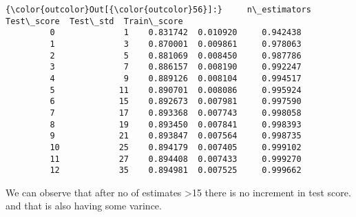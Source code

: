 \documentclass[11pt]{article}
\begin{document}
\begin{Verbatim}[commandchars=\\\{\}]
{\color{outcolor}Out[{\color{outcolor}56}]:}     n\_estimators  Test\_score  Test\_std  Train\_score
         0              1    0.831742  0.010920     0.942438
         1              3    0.870001  0.009861     0.978063
         2              5    0.881069  0.008450     0.987786
         3              7    0.886157  0.008190     0.992247
         4              9    0.889126  0.008104     0.994517
         5             11    0.890701  0.008086     0.995924
         6             15    0.892673  0.007981     0.997590
         7             17    0.893368  0.007743     0.998058
         8             19    0.893450  0.007841     0.998393
         9             21    0.893847  0.007564     0.998735
         10            25    0.894179  0.007405     0.999102
         11            27    0.894408  0.007433     0.999270
         12            35    0.894981  0.007525     0.999662
\end{Verbatim}
            
    We can observe that after no of estimates \textgreater{}15 there is no
increment in test score. and that is also having some varince.
\end{document}
